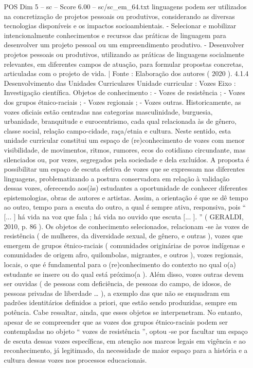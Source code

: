 \begin{textsample}{POS Dim 5 – sc – Score 6.00 – sc/sc\_em\_64.txt}
linguagens podem ser utilizados na concretização de projetos pessoais ou produtivos, considerando as diversas tecnologias disponíveis e os impactos socioambientais. - Selecionar e mobilizar intencionalmente conhecimentos e recursos das práticas de linguagem para desenvolver um projeto pessoal ou um empreendimento produtivo. - Desenvolver projetos pessoais ou produtivos, utilizando as práticas de linguagens socialmente relevantes, em diferentes campos de atuação, para formular propostas concretas, articuladas com o projeto de vida. | Fonte : Elaboração dos autores ( 2020 ). 4.1.4 Desenvolvimento das Unidades Curriculares Unidade curricular : Vozes Eixo : Investigação científica.
Objetos de conhecimento : - Vozes de resistência ; - Vozes dos grupos étnico-raciais ; - Vozes regionais ; - Vozes outras.
Historicamente, as vozes oficiais estão centradas nas categorias masculinidade, burguesia, urbanidade, branquitude e eurocentrismo, cada qual relacionada às de gênero, classe social, relação campo-cidade, raça/etnia e cultura.
Neste sentido, esta unidade curricular constitui um espaço de (re)conhecimento de vozes com menor visibilidade, de movimentos, ritmos, rumores, ecos do cotidiano circundante, mas silenciados ou, por vezes, segregados pela sociedade e dela excluídos.
A proposta é possibilitar um espaço de escuta efetiva de vozes que se expressam nas diferentes linguagens, problematizando a postura conservadora em relação à validação dessas vozes, oferecendo aos(às) estudantes a oportunidade de conhecer diferentes epistemologias, obras de autores e artistas.
Assim, a orientação é que se dê tempo ao outro, tempo para a escuta do outro, a qual é sempre ativa, responsiva, pois “ [... ] há vida na voz que fala ; há vida no ouvido que escuta [... ]. ” ( GERALDI, 2010, p. 86 ).
Os objetos de conhecimento selecionados, relacionam -se às vozes de resistência ( de mulheres, da diversidade sexual, de gênero, e outras ), vozes que emergem de grupos étnico-raciais ( comunidades originárias de povos indígenas e comunidades de origem afro, quilombolas, migrantes, e outros ), vozes regionais, locais, o que é fundamental para o (re)conhecimento do contexto no qual o(a) estudante se insere ou do qual está próximo(a ).
Além disso, vozes outras devem ser ouvidas ( de pessoas com deficiência, de pessoas do campo, de idosos, de pessoas privadas de liberdade … ), a exemplo das que não se enquadram em padrões identitários definidos a priori, que estão sendo produzidas, sempre em potência.
Cabe ressaltar, ainda, que esses objetos se interpenetram.
No entanto, apesar de se compreender que as vozes dos grupos étnico-raciais podem ser contempladas no objeto “ vozes de resistência ”, optou -se por facultar um espaço de escuta dessas vozes específicas, em atenção aos marcos legais em vigência e ao reconhecimento, já legitimado, da necessidade de maior espaço para a história e a cultura dessas vozes nos processos educacionais.

\end{textsample}
